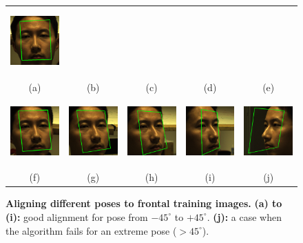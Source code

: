 \begin{enumerate}
\begin{figure}
\begin{tabular}{ccccc}
\includegraphics[height=1in]{figures_cvpr/13} \\
(a) & (b) & (c) & (d) & (e)\vspace{3mm}\\
\includegraphics[height=1in]{figures_cvpr/15} &
\includegraphics[height=1in]{figures_cvpr/17} &
\includegraphics[height=1in]{figures_cvpr/19} &
\includegraphics[height=1in]{figures_cvpr/21} &
\includegraphics[height=1in]{figures_cvpr/3} \\
(f) & (g) & (h) & (i) & (j)
\end{tabular}
\caption{{\bf Aligning different poses to frontal training images.} {\bf (a) to (i):}  good alignment for pose from $-45^{\circ}$
to $+45^{\circ}$. {\bf (j):} a case when the algorithm fails for an extreme pose ($>45^{\circ}$).\vspace{0mm}
}\label{fig:pose-alignment}
\end{figure}
\end{enumerate}

